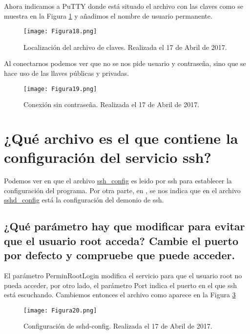 Ahora indicamos a PuTTY donde está situado el archivo con las claves como se muestra en la Figura \ref{fig:figura18} y añadimos el nombre de usuario permanente.

\begin{figure}[H] 
\centering
\texttt{[image: Figura18.png]}  
\caption{Localización del archivo de claves. Realizada el 17 de Abril de 2017.} \label{fig:figura18}
\end{figure}

Al conectarnos podemos ver que no se nos pide usuario y contraseña, sino que se hace uso de las llaves públicas y privadas.

\begin{figure}[H] 
\centering
\texttt{[image: Figura19.png]}  
\caption{Conexión sin contraseña. Realizada el 17 de Abril de 2017.} \label{fig:figura19}
\end{figure}


\section{¿Qué archivo es el que contiene la configuración del servicio ssh?}

Podemos ver en \cite{sshconfig} que el archivo \url{ssh_config} es leido por ssh para establecer la configuración del programa.
Por otra parte, en \cite{sshdconfig}, se nos indica que en el archivo \url{sshd_config} está la configuración del demonio de ssh.

\vspace{6mm}

\subsection{¿Qué parámetro hay que modificar para evitar que el usuario root acceda? Cambie el puerto por defecto y compruebe que puede acceder.}

El parámetro PerminRootLogin modifica el servicio para que el usuario root no pueda acceder, por otro lado, el parámetro Port indica el puerto en el que ssh está escuchando.
Cambiemos entonces el archivo como aparece en la Figura \ref{fig:figura20}

\begin{figure}[H] 
\centering
\texttt{[image: Figura20.png]}  
\caption{Configuración de sshd-config. Realizada el 17 de Abril de 2017.} \label{fig:figura20}
\end{figure}

